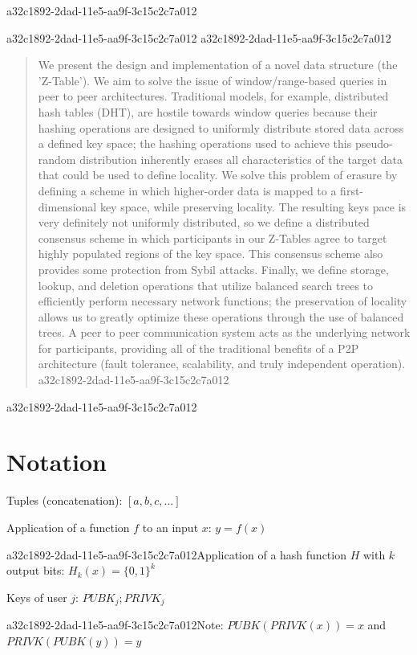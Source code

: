 \documentclass[12pt]{article}
\begin{document}
a32c1892-2dad-11e5-aa9f-3c15c2c7a012
\maketitle
a32c1892-2dad-11e5-aa9f-3c15c2c7a012
a32c1892-2dad-11e5-aa9f-3c15c2c7a012\begin{abstract}
We present the design and implementation of a novel data structure (the 'Z-Table'). We aim to solve the issue of window/range-based queries in peer to peer architectures. Traditional models, for example,  distributed hash tables (DHT), are hostile towards window queries because their hashing operations are designed to uniformly distribute stored data across a defined key space; the hashing operations used to achieve this pseudo-random distribution inherently erases all characteristics of the target data that could be used to define locality. We solve this problem of erasure by defining a scheme in which higher-order data is mapped to a first-dimensional key space, while preserving locality. The resulting keys pace is very definitely not uniformly distributed, so we define a distributed consensus scheme in which participants in our Z-Tables agree to target highly populated regions of the key space. This consensus scheme also provides some protection from Sybil attacks. Finally, we define storage, lookup, and deletion operations that utilize balanced search trees to efficiently perform necessary network functions; the preservation of locality allows us to greatly optimize these operations through the use of balanced trees. A peer to peer communication system acts as the underlying network for participants, providing all of the traditional benefits of a P2P architecture (fault tolerance, scalability, and truly independent operation).
a32c1892-2dad-11e5-aa9f-3c15c2c7a012\end{abstract}
a32c1892-2dad-11e5-aa9f-3c15c2c7a012
\section{Notation}

Tuples (concatenation): $[a,b,c,...]$

Application of a function $f$ to an input $x$: $y=f(x)$

a32c1892-2dad-11e5-aa9f-3c15c2c7a012Application of a hash function $H$ with $k$ output bits: $H_{k}(x) = \{0,1\}^k$

Keys of user $j$: $ PUBK_j; PRIVK_j $

a32c1892-2dad-11e5-aa9f-3c15c2c7a012Note: $PUBK(PRIVK(x)) = x$ and $PRIVK(PUBK(y)) = y$~
\end{document}
